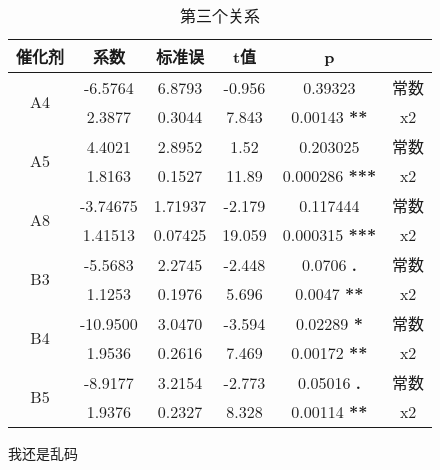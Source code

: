 \documentclass{article}
\begin{document}
\begin{table}
    \centering
    \caption{第三个关系}
    \begin{tabular}{c|c|c|c|c|c}
        \hline
        催化剂               & 系数     & 标准误  & t值    & p                     &      \\
        \hline
        \multirow{2}{*}{A4}  & -6.5764  & 6.8793  & -0.956 & 0.39323               & 常数 \\
                             & 2.3877   & 0.3044  & 7.843  & 0.00143 \textbf{**}   & x2   \\
        \hline
        \multirow{2}{*}{A5}  & 4.4021   & 2.8952  & 1.52   & 0.203025              & 常数 \\
                             & 1.8163   & 0.1527  & 11.89  & 0.000286 \textbf{***} & x2   \\
        \hline
        \multirow{2}{*}{A8}  & -3.74675 & 1.71937 & -2.179 & 0.117444              & 常数 \\
                             & 1.41513  & 0.07425 & 19.059 & 0.000315 \textbf{***} & x2   \\
        \hline
        \multirow{2}{*}{B3} & -5.5683  & 2.2745  & -2.448 & 0.0706 \textbf{.}     & 常数 \\
                             & 1.1253   & 0.1976  & 5.696  & 0.0047 \textbf{**}    & x2   \\
        \hline
        \multirow{2}{*}{B4} & -10.9500 & 3.0470  & -3.594 & 0.02289 \textbf{*}    & 常数 \\
                             & 1.9536   & 0.2616  & 7.469  & 0.00172 \textbf{**}   & x2   \\
        \hline
        \multirow{2}{*}{B5} & -8.9177  & 3.2154  & -2.773 & 0.05016 \textbf{.}    & 常数 \\
                             & 1.9376   & 0.2327  & 8.328  & 0.00114 \textbf{**}   & x2   \\
        \hline
    \end{tabular}
\end{table}
我还是乱码
\newpage
\end{document}
